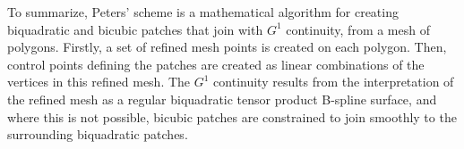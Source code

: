 To summarize, Peters' scheme is a mathematical algorithm for creating biquadratic and bicubic \Bez patches that join with $G^1$ continuity, from a mesh of polygons. Firstly, a set of refined mesh points is created on each polygon. Then, \Bez control points defining the patches are created as linear combinations of the vertices in this refined mesh. The $G^1$ continuity results from the interpretation of the refined mesh as a regular biquadratic tensor product B-spline surface, and where this is not possible, bicubic \Bez patches are constrained to join smoothly to the surrounding biquadratic patches.
%


%
